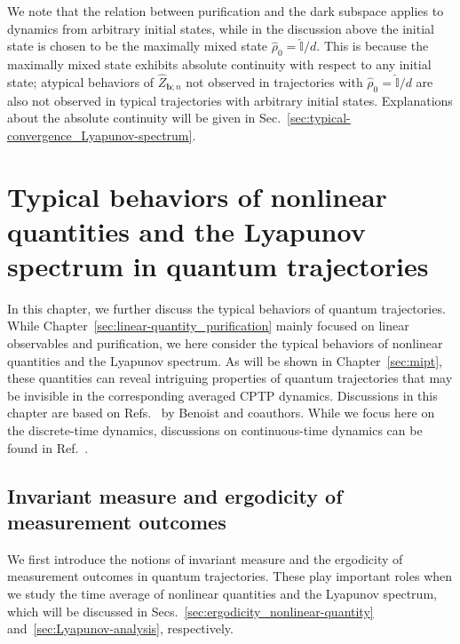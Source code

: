 \documentclass[preprint,pteplogo]{ptephy_v2}%
\numberwithin{equation}{section}
\theoremstyle{definition}
\begin{document}
We note that the relation between purification and the dark subspace applies to dynamics from arbitrary initial states, while in the discussion above the initial state is chosen to be the maximally mixed state $\hat{\rho}_0=\hat{\mathbb{I}}/d$. 
This is because the maximally mixed state exhibits absolute continuity with respect to any initial state; atypical behaviors of $\hat{Z}_{\bm{b};n}$ not observed in trajectories with $\hat{\rho}_0=\hat{\mathbb{I}}/d$ are also not observed in typical trajectories with arbitrary initial states. 
Explanations about the absolute continuity will be given in Sec.~\ref{sec:typical-convergence_Lyapunov-spectrum}. 


\section{Typical behaviors of nonlinear quantities and the Lyapunov spectrum in quantum trajectories}
\label{sec:nonlear-quantity_Lyapunov-spectrum}
In this chapter, we further discuss the typical behaviors of quantum trajectories. 
While Chapter~\ref{sec:linear-quantity_purification} mainly focused on linear observables and purification, we here consider the typical behaviors of nonlinear quantities and the Lyapunov spectrum. 
As will be shown in Chapter~\ref{sec:mipt}, these quantities can reveal intriguing properties of quantum trajectories that may be invisible in the corresponding averaged CPTP dynamics. 
Discussions in this chapter are based on Refs.~\cite{benoist2019invariant, benoist2023limit} by Benoist and coauthors. 
While we focus here on the discrete-time dynamics, discussions on continuous-time dynamics can be found in Ref.~\cite{benoist2021invariant}.


\subsection{Invariant measure and ergodicity of measurement outcomes}
\label{sec:invariant-measure_ergodicity_outcomes}
We first introduce the notions of invariant measure and the ergodicity of measurement outcomes in quantum trajectories. 
These play important roles when we study the time average of nonlinear quantities and the Lyapunov spectrum, which will be discussed in Secs.~\ref{sec:ergodicity_nonlinear-quantity} and~\ref{sec:Lyapunov-analysis}, respectively.
\end{document}
